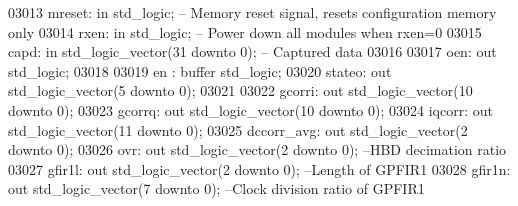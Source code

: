 \begin{DoxyCode}
03013         mreset: \textcolor{keywordflow}{in} \textcolor{comment}{std\_logic};   \textcolor{keyword}{-- Memory reset signal, resets configuration memory only}
03014         rxen: \textcolor{keywordflow}{in} \textcolor{comment}{std\_logic}; \textcolor{keyword}{-- Power down all modules when rxen=0}
03015         capd: \textcolor{keywordflow}{in} \textcolor{comment}{std\_logic\_vector}(\textcolor{vhdllogic}{}\textcolor{vhdllogic}{31} \textcolor{keywordflow}{downto} \textcolor{vhdllogic}{}\textcolor{vhdllogic}{0}); \textcolor{keyword}{-- Captured data}
03016         
03017         oen: \textcolor{keywordflow}{out} \textcolor{comment}{std\_logic};
03018         
03019         en      : \textcolor{keywordflow}{buffer} \textcolor{comment}{std\_logic};
03020         stateo: \textcolor{keywordflow}{out} \textcolor{comment}{std\_logic\_vector}(\textcolor{vhdllogic}{}\textcolor{vhdllogic}{5} \textcolor{keywordflow}{downto} \textcolor{vhdllogic}{}\textcolor{vhdllogic}{0});
03021 
03022         gcorri: \textcolor{keywordflow}{out} \textcolor{comment}{std\_logic\_vector}(\textcolor{vhdllogic}{}\textcolor{vhdllogic}{10} \textcolor{keywordflow}{downto} \textcolor{vhdllogic}{}\textcolor{vhdllogic}{0});
03023         gcorrq: \textcolor{keywordflow}{out} \textcolor{comment}{std\_logic\_vector}(\textcolor{vhdllogic}{}\textcolor{vhdllogic}{10} \textcolor{keywordflow}{downto} \textcolor{vhdllogic}{}\textcolor{vhdllogic}{0});
03024         iqcorr: \textcolor{keywordflow}{out} \textcolor{comment}{std\_logic\_vector}(\textcolor{vhdllogic}{}\textcolor{vhdllogic}{11} \textcolor{keywordflow}{downto} \textcolor{vhdllogic}{}\textcolor{vhdllogic}{0});
03025         dccorr\_avg: \textcolor{keywordflow}{out} \textcolor{comment}{std\_logic\_vector}(\textcolor{vhdllogic}{}\textcolor{vhdllogic}{2} \textcolor{keywordflow}{downto} \textcolor{vhdllogic}{}\textcolor{vhdllogic}{0});
03026         ovr: \textcolor{keywordflow}{out} \textcolor{comment}{std\_logic\_vector}(\textcolor{vhdllogic}{}\textcolor{vhdllogic}{2} \textcolor{keywordflow}{downto} \textcolor{vhdllogic}{}\textcolor{vhdllogic}{0});  \textcolor{keyword}{--HBD decimation ratio}
03027         gfir1l: \textcolor{keywordflow}{out} \textcolor{comment}{std\_logic\_vector}(\textcolor{vhdllogic}{}\textcolor{vhdllogic}{2} \textcolor{keywordflow}{downto} \textcolor{vhdllogic}{}\textcolor{vhdllogic}{0});       \textcolor{keyword}{--Length of GPFIR1}
03028         gfir1n: \textcolor{keywordflow}{out} \textcolor{comment}{std\_logic\_vector}(\textcolor{vhdllogic}{}\textcolor{vhdllogic}{7} \textcolor{keywordflow}{downto} \textcolor{vhdllogic}{}\textcolor{vhdllogic}{0});       \textcolor{keyword}{--Clock division ratio of GPFIR1}

\end{DoxyCode}
